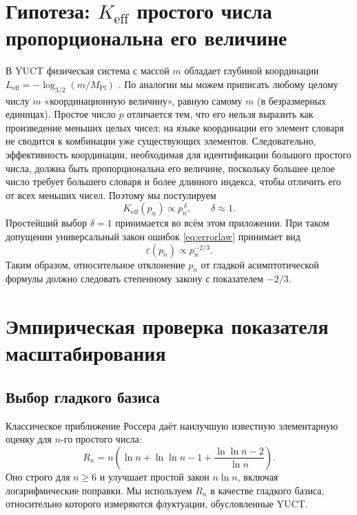 \documentclass[12pt,a4paper]{article}
\begin{document}
	\section{Гипотеза: \(K_{\mathrm{eff}}\) простого числа пропорциональна его величине}
	В YUCT физическая система с массой \(m\) обладает глубиной координации \(L_{\mathrm{eff}} = -\log_{3/2}(m/M_{\mathrm{Pl}})\) \cite{YakushevLaw2026}. По аналогии мы можем приписать любому целому числу \(m\) «координационную величину», равную самому \(m\) (в безразмерных единицах). Простое число \(p\) отличается тем, что его нельзя выразить как произведение меньших целых чисел; на языке координации его элемент словаря не сводится к комбинации уже существующих элементов. Следовательно, эффективность координации, необходимая для идентификации большого простого числа, должна быть пропорциональна его величине, поскольку большее целое число требует большего словаря и более длинного индекса, чтобы отличить его от всех меньших чисел. Поэтому мы постулируем
	\begin{equation}\label{eq:Keff-prime}
		K_{\mathrm{eff}}(p_n) \propto p_n^{\,\delta}, \qquad \delta \approx 1.
	\end{equation}
	Простейший выбор \(\delta = 1\) принимается во всём этом приложении. При таком допущении универсальный закон ошибок \eqref{eq:errorlaw} принимает вид
	\begin{equation}\label{eq:error-prime}
		\varepsilon(p_n) \propto p_n^{-2/3}.
	\end{equation}
	Таким образом, относительное отклонение \(p_n\) от гладкой асимптотической формулы должно следовать степенному закону с показателем \(-2/3\).
	
	\section{Эмпирическая проверка показателя масштабирования}
	\subsection{Выбор гладкого базиса}
	Классическое приближение Россера \cite{Rosser1941} даёт наилучшую известную элементарную оценку для \(n\)-го простого числа:
	\begin{equation}\label{eq:rosser}
		R_n = n\!\left(\ln n + \ln\ln n - 1 + \frac{\ln\ln n - 2}{\ln n}\right).
	\end{equation}
	Оно строго для \(n \ge 6\) и улучшает простой закон \(n\ln n\), включая логарифмические поправки. Мы используем \(R_n\) в качестве гладкого базиса, относительно которого измеряются флуктуации, обусловленные YUCT.
	
\end{document}
